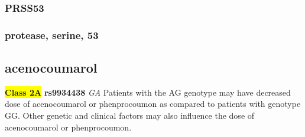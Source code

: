 \documentclass{book}
\begin{document}
\subsubsection{ PRSS53 }
\subsubsection{ protease, serine, 53 }

\subsection{ acenocoumarol }


\begin{center}


\textbf{\colorbox{yellow} {Class 2A}} \textbf{ rs9934438 } \textit{ GA }
Patients with the AG genotype may have decreased dose of acenocoumarol or phenprocoumon as compared to patients with genotype GG. Other genetic and clinical factors may also influence the dose of acenocoumarol or phenprocoumon.


\end{center}
\end{document}
